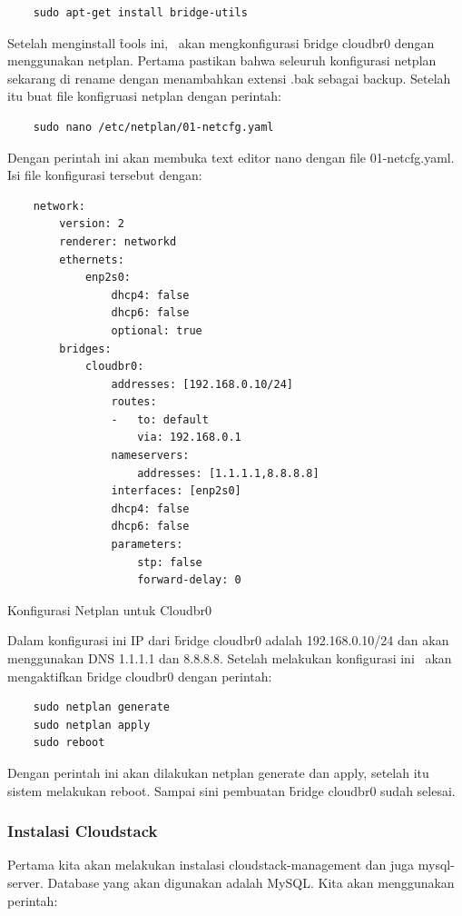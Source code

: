 \begin{verbatim}
    sudo apt-get install bridge-utils
\end{verbatim}

Setelah menginstall \f{tools} ini, \saya\ akan mengkonfigurasi \f{bridge} cloudbr0 dengan menggunakan netplan. Pertama pastikan bahwa seleuruh konfigurasi netplan sekarang di rename dengan menambahkan extensi .bak sebagai backup. Setelah itu buat file konfigruasi netplan dengan perintah:

\begin{verbatim}
    sudo nano /etc/netplan/01-netcfg.yaml
\end{verbatim}

Dengan perintah ini akan membuka text editor nano dengan file 01-netcfg.yaml. Isi file konfigurasi tersebut dengan:

\begin{listing}[H]
    \begin{verbatim}
    network:
        version: 2
        renderer: networkd
        ethernets:
            enp2s0:
                dhcp4: false
                dhcp6: false
                optional: true
        bridges:
            cloudbr0:
                addresses: [192.168.0.10/24]
                routes:
                -   to: default
                    via: 192.168.0.1
                nameservers:
                    addresses: [1.1.1.1,8.8.8.8]
                interfaces: [enp2s0]
                dhcp4: false
                dhcp6: false
                parameters:
                    stp: false
                    forward-delay: 0
    \end{verbatim}
    \caption{Konfigurasi Netplan untuk Cloudbr0}
    \label{code:netplan_config}
\end{listing}

Dalam konfigurasi ini IP dari \f{bridge} cloudbr0 adalah 192.168.0.10/24 dan akan menggunakan DNS 1.1.1.1 dan 8.8.8.8. Setelah melakukan konfigurasi ini \saya\ akan mengaktifkan \f{bridge} cloudbr0 dengan perintah:

\begin{verbatim}
    sudo netplan generate
    sudo netplan apply
    sudo reboot
\end{verbatim}

Dengan perintah ini akan dilakukan netplan generate dan apply, setelah itu sistem melakukan reboot. Sampai sini pembuatan \f{bridge} cloudbr0 sudah selesai.

\subsubsection{Instalasi Cloudstack}
Pertama kita akan melakukan instalasi cloudstack-management dan juga mysql-server. Database yang akan digunakan adalah MySQL. Kita akan menggunakan perintah:

